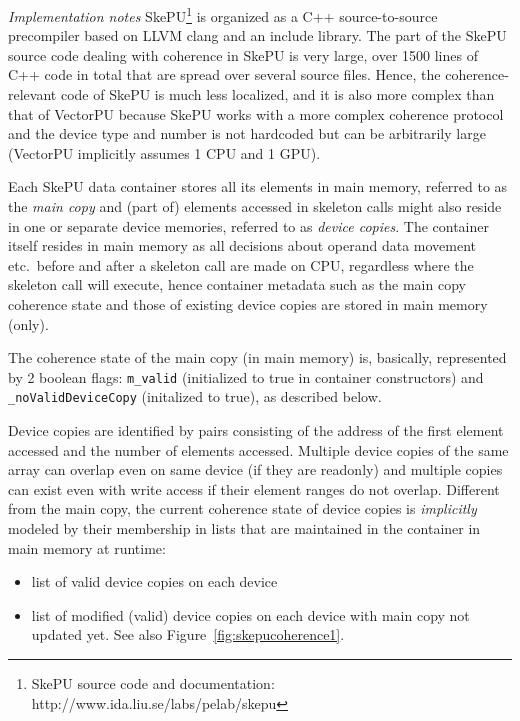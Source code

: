 \vspace{1.4mm}
\noindent
{\em Implementation notes }
SkePU\footnote{SkePU source code and documentation: http://www.ida.liu.se/labs/pelab/skepu} 
is organized as a C++ source-to-source precompiler based on 
LLVM clang and an include library.
The part of the SkePU source code dealing with coherence in SkePU 
is very large, over 1500 lines of C++ code in total that are 
spread over several source files. Hence, 
the coherence-relevant code of SkePU is much less
localized, and it is also more complex than that of VectorPU
because SkePU works with a more complex coherence protocol
and the device type and number is not hardcoded but can be 
arbitrarily large (VectorPU implicitly assumes 1 CPU and 1 GPU).
%

Each SkePU data container stores all its elements in main memory,
referred to as the \emph{main copy} and
(part of) elements accessed in skeleton calls might also reside
in one or separate device memories, referred to as \emph{device copies}.
The container itself resides in main memory as all decisions
about operand data movement etc.\ before and after a skeleton call 
are made on CPU, regardless where the skeleton call will execute, 
hence container metadata such as the main copy coherence state 
and those of existing device copies are stored in main memory (only).

The coherence state of the main copy (in main memory) 
is, basically, represented by 2 boolean flags: 
\verb+m_valid+ (initialized to true in container constructors) and 
\verb+_noValidDeviceCopy+ (initalized to true), as described below.

Device copies are identified by pairs consisting of the
address of the first element accessed and the number of
elements accessed. 
Multiple device copies of the same array can overlap 
even on same device (if they are readonly)
and multiple copies can exist even with write access if their element ranges do not overlap.
%
Different from the main copy, the current coherence state of device copies 
is \emph{implicitly} modeled by their membership in lists
that are maintained in the container in main memory at runtime: 
\begin{itemize}
\item list of valid device copies on each device
\item list of modified (valid) device copies on each device with main copy not updated yet. See also Figure~\ref{fig:skepucoherence1}.
\end{itemize}

